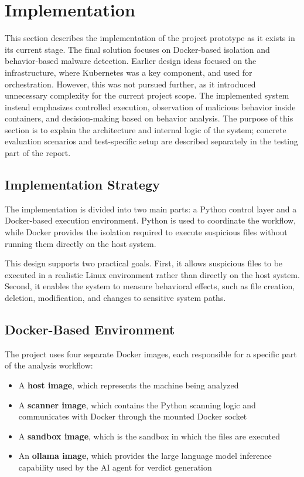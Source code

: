 \section{Implementation}
\noindent
This section describes the implementation of the project prototype as it exists in its current stage. The final solution focuses on Docker-based isolation and behavior-based malware detection. Earlier design ideas focused on the infrastructure, where Kubernetes was a key component, and used for orchestration. However, this was not pursued further, as it introduced unnecessary complexity for the current project scope. The implemented system instead emphasizes controlled execution, observation of malicious behavior inside containers, and decision-making based on behavior analysis. The purpose of this section is to explain the architecture and internal logic of the system; concrete evaluation scenarios and test-specific setup are described separately in the testing part of the report.
 
\subsection{Implementation Strategy}
\noindent
The implementation is divided into two main parts: a Python control layer and a Docker-based execution environment. Python is used to coordinate the workflow, while Docker provides the isolation required to execute suspicious files without running them directly on the host system.
 
\vspace{1em}
 
This design supports two practical goals. First, it allows suspicious files to be executed in a realistic Linux environment rather than directly on the host system. Second, it enables the system to measure behavioral effects, such as file creation, deletion, modification, and changes to sensitive system paths.
 
\subsection{Docker-Based Environment}
\noindent
The project uses four separate Docker images, each responsible for a specific part of the analysis workflow:

\begin{itemize}
\item A \textbf{host image}, which represents the machine being analyzed
\item A \textbf{scanner image}, which contains the Python scanning logic and communicates with Docker through the mounted Docker socket
\item A \textbf{sandbox image}, which is the sandbox in which the files are executed
\item An \textbf{ollama image}, which provides the large language model inference capability used by the AI agent for verdict generation
\end{itemize}

